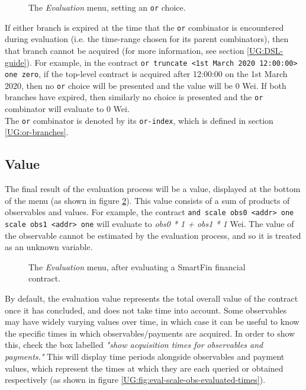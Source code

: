 \begin{figure}[h]
    \centering
    \caption{The \textit{Evaluation} menu, setting an \texttt{or} choice.}
    \label{UG:fig:eval-or-select}
\end{figure}

If either branch is expired at the time that the \texttt{or} combinator is encountered during evaluation (i.e. the time-range chosen for its parent combinators), then that branch cannot be acquired (for more information, see section \ref{UG:DSL-guide}). For example, in the contract \texttt{or truncate <1st March 2020 12:00:00> one zero}, if the top-level contract is acquired after 12:00:00 on the 1st March 2020, then no \texttt{or} choice will be presented and the value will be 0 Wei. If both branches have expired, then similarly no choice is presented and the \texttt{or} combinator will evaluate to 0 Wei. \\

The \texttt{or} combinator is denoted by its \texttt{or-index}, which is defined in section \ref{UG:or-branches}.


\subsection{Value}

The final result of the evaluation process will be a value, displayed at the bottom of the menu (as shown in figure \ref{UG:fig:eval-scale-obs-evaluated}). This value consists of a sum of products of observables and values. For example, the contract \texttt{and scale obs0 <addr> one scale obs1 <addr> one} will evaluate to \textit{obs0 * 1 + obs1 * 1} Wei. The value of the observable cannot be estimated by the evaluation process, and so it is treated as an unknown variable.

\begin{figure}[h]
    \centering
    \caption{The \textit{Evaluation} menu, after evaluating a SmartFin financial contract.}
    \label{UG:fig:eval-scale-obs-evaluated}
\end{figure}

By default, the evaluation value represents the total overall value of the contract once it has concluded, and does not take time into account. Some observables may have widely varying values over time, in which case it can be useful to know the specific times in which observables/payments are acquired. In order to show this, check the box labelled \textit{"show acquisition times for observables and payments."} This will display time periods alongside observables and payment values, which represent the times at which they are each queried or obtained respectively (as shown in figure \ref{UG:fig:eval-scale-obs-evaluated-times}).

